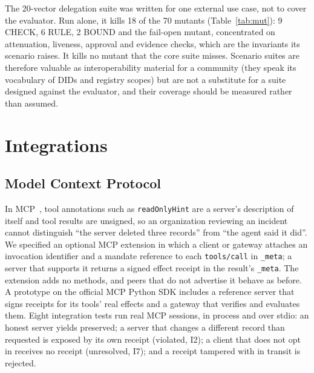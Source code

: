 \documentclass[conference]{IEEEtran}
\newcommand{\pres}{\textsf{preserved}}
\newcommand{\viol}{\textsf{violated}}
\newcommand{\unres}{\textsf{unresolved}}
\newcommand{\code}[1]{\texttt{\small #1}}
\begin{document}
The 20-vector delegation suite was written for one external use case, not to cover the evaluator. Run alone, it kills 18 of the 70 mutants (Table~\ref{tab:mut}): 9 CHECK, 6 RULE, 2 BOUND and the fail-open mutant, concentrated on attenuation, liveness, approval and evidence checks, which are the invariants its scenario raises. It kills no mutant that the core suite misses. Scenario suites are therefore valuable as interoperability material for a community (they speak its vocabulary of DIDs and registry scopes) but are not a substitute for a suite designed against the evaluator, and their coverage should be measured rather than assumed.

\section{Integrations}\label{sec:integrations}

\subsection{Model Context Protocol}
In MCP~\cite{mcp}, tool annotations such as \code{readOnlyHint} are a server's description of itself and tool results are unsigned, so an organization reviewing an incident cannot distinguish ``the server deleted three records'' from ``the agent said it did''. We specified an optional MCP extension in which a client or gateway attaches an invocation identifier and a mandate reference to each \code{tools/call} in \code{\_meta}; a server that supports it returns a signed effect receipt in the result's \code{\_meta}. The extension adds no methods, and peers that do not advertise it behave as before. A prototype on the official MCP Python SDK includes a reference server that signs receipts for its tools' real effects and a gateway that verifies and evaluates them. Eight integration tests run real MCP sessions, in process and over stdio: an honest server yields \pres{}; a server that changes a different record than requested is exposed by its own receipt (\viol{}, I2); a client that does not opt in receives no receipt (\unres{}, I7); and a receipt tampered with in transit is rejected.
\end{document}
